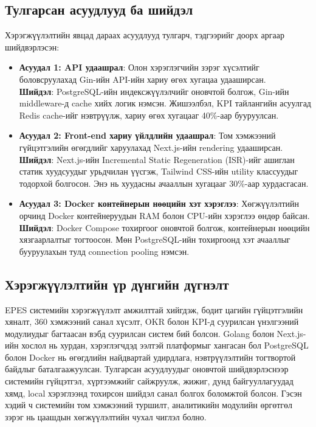 \subsection{Тулгарсан асуудлууд ба шийдэл}
Хэрэгжүүлэлтийн явцад дараах асуудлууд тулгарч, тэдгээрийг доорх аргаар шийдвэрлэсэн:
\begin{itemize}
    \item \textbf{Асуудал 1: API удаашрал}: Олон хэрэглэгчийн зэрэг хүсэлтийг боловсруулахад Gin-ийн API-ийн хариу өгөх хугацаа удааширсан. \\
    \textbf{Шийдэл}: PostgreSQL-ийн индексжүүлэлчийг оновчтой болгож, Gin-ийн middleware-д cache хийх логик нэмсэн. Жишээлбэл, KPI тайлангийн асуулгад Redis cache-ийг нэвтрүүлж, 
    хариу өгөх хугацааг 40\%-аар бууруулсан.
    \item \textbf{Асуудал 2: Front-end хариу үйлдлийн удаашрал}: Том хэмжээний гүйцэтгэлийн өгөгдлийг харуулахад Next.js-ийн rendering удааширсан. \\
    \textbf{Шийдэл}: Next.js-ийн Incremental Static Regeneration (ISR)-ийг ашиглан статик хуудсуудыг урьдчилан үүсгэж, Tailwind CSS-ийн utility классуудыг тодорхой болгосон. 
    Энэ нь хуудасны ачааллын хугацааг 30\%-аар хурдасгасан.
    \item \textbf{Асуудал 3: Docker контейнерын нөөцийн хэт хэрэглээ}: Хөгжүүлэлтийн орчинд Docker контейнеруудын RAM болон CPU-ийн хэрэглээ өндөр байсан. \\
    \textbf{Шийдэл}: Docker Compose тохиргоог оновчтой болгож, контейнерын нөөцийн хязгаарлалтыг тогтоосон. Мөн PostgreSQL-ийн тохиргоонд хэт ачааллыг бууруулахын 
    тулд connection pooling нэмсэн.
\end{itemize}

\subsection{Хэрэгжүүлэлтийн үр дүнгийн дүгнэлт}
EPES системийн хэрэгжүүлэлт амжилттай хийгдэж, бодит цагийн гүйцэтгэлийн хяналт, 360 хэмжээний санал хүсэлт, OKR болон KPI-д суурилсан үнэлгээний модулиудыг багтаасан вэбд 
суурилсан систем бий болсон. Golang болон Next.js-ийн хослол нь хурдан, хэрэглэгчдэд ээлтэй платформыг хангасан бол PostgreSQL болон Docker нь өгөгдлийн найдвартай удирдлага, 
нэвтрүүлэлтийн тогтвортой байдлыг баталгаажуулсан. Тулгарсан асуудлуудыг оновчтой шийдвэрлэснээр системийн гүйцэтгэл, хүртээмжийг сайжруулж, жижиг, дунд байгууллагуудад 
хямд, local хэрэглээнд тохирсон шийдэл санал болгох боломжтой болсон. Гэсэн хэдий ч системийн том хэмжээний туршилт, аналитикийн модулийн өргөтгөл зэрэг нь цаашдын хөгжүүлэлтийн 
чухал чиглэл болно.


